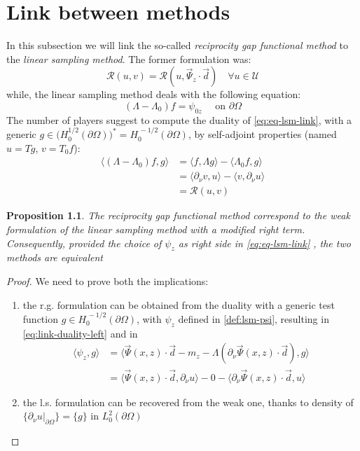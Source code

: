 \documentclass[10pt, a4paper, twoside, openright]{book}
\theoremstyle{definition}
\theoremstyle{plain}
\theoremstyle{plain}
\theoremstyle{plain}
\newtheorem{proposition}[subsection]{Proposition}
\theoremstyle{plain}
\theoremstyle{plain}
\theoremstyle{plain}
\theoremstyle{plain}
\theoremstyle{plain}
\begin{document}
\chapter{Link between methods}
\label{ch:link}
In this subsection we will link the so-called \textit{reciprocity gap functional method} to the \emph{linear sampling method}.
The former formulation was:
\begin{equation}
 \mathcal{R}(u, v) = \mathcal{R}(u, \vec{\Psi}_z\cdot\vec{d})\quad \forall u \in \mathcal{U}
\end{equation}
while, the linear sampling method deals with the following equation:
\begin{equation}
\label{eq:eq-lsm-link}
 (\Lambda - \Lambda_0)f = \psi_{0z} \quad \text{ on }\partial \Omega
\end{equation}
The number of players suggest to compute the duality of \ref{eq:eq-lsm-link}, with a generic 
${g \in \bigl(H^{1/2}_0(\partial \Omega)\bigr)^* = H^{\,-1/2}_0(\partial \Omega)}$, by self-adjoint properties (named $u=Tg$, $v=T_0f$):
\begin{align}
 \label{eq:link-duality-left}
 \langle(\Lambda - \Lambda_0)f,g\rangle & =  \langle f,\Lambda g\rangle - \langle \Lambda_0 f,g\rangle \\
                                        & = \langle \partial_\nu v,u\rangle - \langle v,\partial_\nu u\rangle \\
                                        & = \mathcal{R}(u,v)
\end{align}
\begin{proposition}
 The \textit{reciprocity gap functional method} correspond to the weak formulation of the \textit{linear sampling method} with a modified right term. Consequently, provided the choice of $\psi_z$ as right side in \ref{eq:eq-lsm-link} , the two methods are equivalent
\end{proposition}
\begin{proof}
 We need to prove both the implications:
\begin{enumerate}
 \item the r.g. formulation can be obtained from the duality with a generic test function $g\in H^{\, -1/2}_0(\partial \Omega)$, with $\psi_z$ defined in \ref{def:lsm-psi}, resulting in \ref{eq:link-duality-left} and in
\begin{align}
 \langle \psi_z , g \rangle  & = \langle \vec{\Psi}(x,z)\cdot\vec{d} - m_z - \Lambda(\partial_\nu \vec{\Psi}(x,z) \cdot \vec{d}) , g \rangle \\
                             & = \langle \vec{\Psi}(x,z)\cdot\vec{d},\partial_\nu u\rangle - 0 - \langle\partial_\nu \vec{\Psi}(x,z) \cdot \vec{d},u\rangle
\end{align}
 \item the l.s. formulation can be recovered from the weak one, thanks to density of $\{\partial_\nu u|_{\partial \Omega}\}=\{g\}$ in $L_0^2(\partial \Omega)$
\end{enumerate}
\end{proof}
\end{document}
